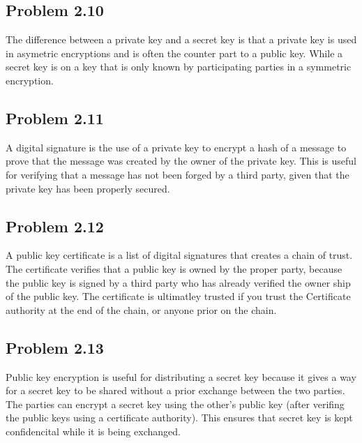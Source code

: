 \documentclass[14pt]{article}
\begin{document}
\subsection{Problem  2.10}
The difference between a private key and a secret key is that a private key is used  in asymetric encryptions and is often the counter part to a public key. While a secret key is on a key that is only known by participating parties in a symmetric encryption. 

\subsection{Problem  2.11}
A digital signature is the use of a private key to encrypt  a hash of a message to prove that the message was created by the owner of the private key. This is useful for verifying that a message has not been forged by a third party, given that the private key has been properly secured. 

\subsection{Problem  2.12}
A public key certificate is a list of digital signatures that creates a chain of trust. The certificate verifies that a public key is owned by the proper party, because the public key is signed by a third party who has already verified the owner ship of the public key. The certificate is ultimatley trusted if you trust the Certificate authority at the end of the chain, or anyone prior on the chain.

\subsection{Problem  2.13}
Public key encryption is useful for distributing a secret key because it gives a way for a secret key to be shared without a prior exchange between the two parties. The parties can encrypt a secret key using the other's public key (after verifing the public keys using a certificate authority). This ensures that secret key is kept confidencital while it is being exchanged.


\newpage




\end{document}
